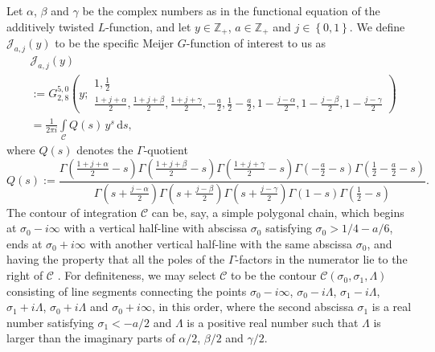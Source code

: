 \documentclass[a4paper,10pt,twoside]{amsart}
\theoremstyle{definition}
\numberwithin{equation}{section}
\renewcommand\:{\colon}
\begin{document}
Let $\alpha$, $\beta$ and $\gamma$ be the complex numbers as in the functional equation of the additively twisted $L$-function, and let $y\in\mathbb Z_+$, $a\in\mathbb Z_+$ and $j\in\left\{0,1\right\}$.
We define $\mathscr J_{a,j}(y)$ to be the specific Meijer $G$-function of interest to us as
\begin{align*}
&\mathscr J_{a,j}(y)\\
&:=G^{5,0}_{2,8}\!\left(y;\begin{array}{l}\displaystyle{1,\frac12}\\[2mm]
\displaystyle{\frac{1+j+\alpha}2,\frac{1+j+\beta}2,
\frac{1+j+\gamma}2,-\frac a2,\frac12-\frac a2,1-\frac{j-\alpha}2,1-\frac{j-\beta}2,1-\frac{j-\gamma}2}\end{array}\right)\\[2mm]
&=\frac1{2\pi i}\int\limits_{\mathscr C}
Q(s)\,y^s\,\mathrm ds,
\end{align*}
where $Q(s)$ denotes the $\Gamma$-quotient
\[Q(s):=\frac{\displaystyle{\Gamma\!\left(\frac{1+j+\alpha}2-s\right)\Gamma\!\left(\frac{1+j+\beta}2-s\right)\Gamma\!\left(\frac{1+j+\gamma}2-s\right)\Gamma\!\left(-\frac a2-s\right)\Gamma\!\left(\frac12-\frac a2-s\right)}}{\displaystyle{\Gamma\!\left(s+\frac{j-\alpha}2\right)\Gamma\!\left(s+\frac{j-\beta}2\right)\Gamma\!\left(s+\frac{j-\gamma}2\right)\Gamma\!\left(1-s\right)\Gamma\!\left(\frac12-s\right)}}.\]
The contour of integration $\mathscr C$ can be, say, a simple polygonal chain, which begins at $\sigma_0-i\infty$ with a vertical half-line with abscissa $\sigma_0$ satisfying $\sigma_0>1/4-a/6$, ends at $\sigma_0+i\infty$ with another vertical half-line with the same abscissa $\sigma_0$, and having the property that all the poles of the $\Gamma$-factors in the numerator lie to the right of $\mathscr C$ \cite[Subsect. 5.3.1]{Luke2}. For definiteness, we may select $\mathscr C$ to be the contour $\mathscr C(\sigma_0,\sigma_1,\Lambda)$ consisting of line segments connecting the points $\sigma_0-i\infty$, $\sigma_0-i\Lambda$, $\sigma_1-i\Lambda$, $\sigma_1+i\Lambda$, $\sigma_0+i\Lambda$ and $\sigma_0+i\infty$, in this order, where the second abscissa $\sigma_1$ is a real number satisfying $\sigma_1<-a/2$ and $\Lambda$ is a positive real number such that $\Lambda$ is larger than the imaginary parts of $\alpha/2$, $\beta/2$ and $\gamma/2$.
\end{document}
